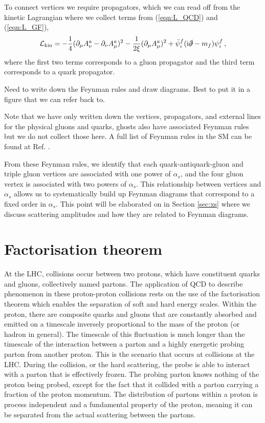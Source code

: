 \documentclass[main.tex]{subfiles}
\begin{document}
    To connect vertices we require propagators, which
    we can read off from the kinetic Lagrangian where
    we collect terms from (\ref{eqn:L_QCD}) and (\ref{eqn:L_GF}), 
    \begin{equation}\label{L_kin}
        \mathcal{L}_{\mathrm{kin}} = -\dfrac{1}{4}(\partial_{\mu}A^{a}_{\nu}-\partial_{\nu}A^{a}_{\mu})^{2} - \dfrac{1}{2\xi}(\partial_{\mu}A^{a}_{\mu})^{2} + \bar{\psi}_{i}^{f}(\mathrm{i}\slashed{\partial}-m_{f})\psi_{i}^{f} \, ,
    \end{equation}
    where the first two terms corresponds to a gluon
    propagator and the third term corresponds to
    a quark propagator.

    {\color{red} Need to write down the Feynman
    rules and draw diagrams. Best to put it in a
    figure that we can refer back to.}

    Note that we have only written down the vertices,
    propagators, and external lines for the physical gluons and quarks,
    ghosts also have associated Feynman rules but we do
    not collect those here. A full list of Feynman rules
    in the SM can be found at Ref. \cite{Romao:2012pq}.

    From these Feynman rules, we identify that each
    quark-antiquark-gluon and triple gluon vertices
    are associated with one power of $\alpha_{s}$,
    and the four gluon vertex is associated with
    two powers of $\alpha_{s}$. This relationship
    between vertices and $\alpha_{s}$ allows
    us to systematically build up Feynman diagrams
    that correspond to a fixed order in $\alpha_{s}$.
    This point will be elaborated on in Section
    \ref{sec:xs} where we discuss scattering amplitudes
    and how they are related to Feynman diagrams.

\section{Factorisation theorem}\label{sec:factorisation}
    At the LHC, collisions occur between two protons,
    which have constituent quarks and gluons, collectively
    named partons.
    The application of QCD to describe phenomenon
    in these proton-proton collisions rests on the use of
    the factorisation theorem which enables the
    separation of soft and hard energy scales.
    Within the proton, there are composite quarks
    and gluons that are constantly absorbed and
    emitted on a timescale inversely proportional
    to the mass of the proton (or hadron in general).
    The timescale of this fluctuation is much longer
    than the timescale of the interaction between
    a parton and a highly energetic probing parton
    from another proton. This is the scenario
    that occurs at collisions at the LHC.
    During the collision, or the hard scattering,
    the probe is able to interact with a
    parton that is effectively frozen.
    The probing parton knows nothing of the
    proton being probed, except for the fact
    that it collided with a parton carrying
    a fraction of the proton momentum. The
    distribution of partons within a proton
    is process independent and a fundamental
    property of the proton, meaning it can be
    separated from the actual scattering between
    the partons.
\end{document}
